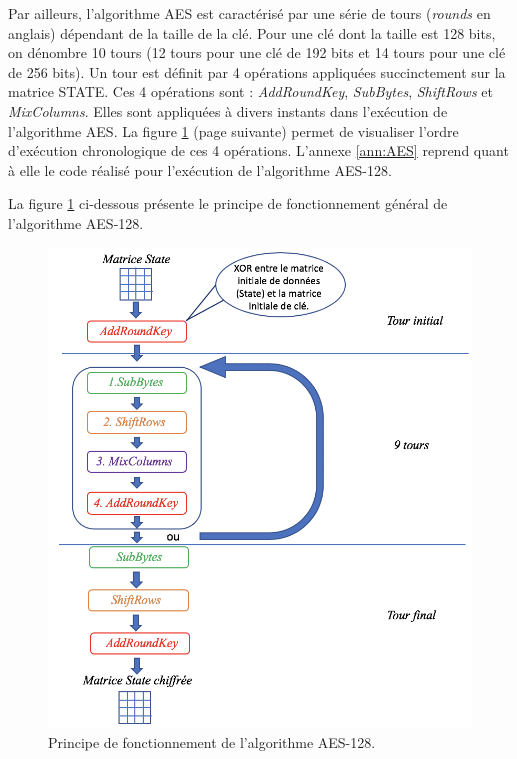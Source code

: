 \documentclass[10pt, oneside, a4paper]{article}
\begin{document}
Par ailleurs, l'algorithme AES est caractérisé par une série de tours (\textit{rounds} en anglais) dépendant de la taille de la clé. Pour une clé dont la taille est 128 bits, on dénombre 10 tours (12 tours pour une clé de 192 bits et 14 tours pour une clé de 256 bits). Un tour est définit par 4 opérations appliquées succinctement sur la matrice STATE. Ces 4 opérations sont : \textit{AddRoundKey}, \textit{SubBytes}, \textit{ShiftRows} et \textit{MixColumns}. Elles sont appliquées à divers instants dans l'exécution de l'algorithme AES. La figure \ref{fig:AES} (page suivante) permet de visualiser l'ordre d'exécution chronologique de ces 4 opérations. L'annexe \ref{ann:AES} reprend quant à elle le code réalisé pour l'exécution de l'algorithme AES-128.

\newpage

La figure \ref{fig:AES} ci-dessous présente le principe de fonctionnement général de l'algorithme AES-128.
\begin{figure}[htbp]
    \centering
    \includegraphics[scale=0.75]{image/AES}
    \caption{Principe de fonctionnement de l'algorithme AES-128.} 
    \label{fig:AES}
\end{figure}
\end{document}
